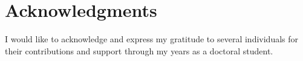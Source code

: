 \documentclass[12pt,dvips]{report}
\begin{document}



\vfill



\pagebreak


\chapter*{Acknowledgments}
I would like to acknowledge and express my gratitude to several individuals for their contributions and support through my years as a doctoral student.
\end{document}

